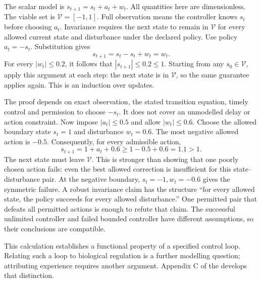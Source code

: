 The scalar model is $s_{t+1}=s_t+a_t+w_t$. All quantities here are dimensionless. The viable set is $\mathcal V=[-1,1]$. Full observation means the controller knows $s_t$ before choosing $a_t$. Invariance requires the next state to remain in $\mathcal V$ for every allowed current state and disturbance under the declared policy.
Use policy $a_t=-s_t$. Substitution gives
\[
s_{t+1}=s_t-s_t+w_t=w_t.
\]
For every $|w_t|\leq0.2$, it follows that $|s_{t+1}|\leq0.2\leq1$. Starting from any $s_0\in\mathcal V$, apply this argument at each step: the next state is in $\mathcal V$, so the same guarantee applies again. This is an induction over updates.

The proof depends on exact observation, the stated transition equation, timely control and permission to choose $-s_t$. It does not cover an unmodelled delay or action constraint.
Now impose $|a_t|\leq0.5$ and allow $|w_t|\leq0.6$. Choose the allowed boundary state $s_t=1$ and disturbance $w_t=0.6$. The most negative allowed action is $-0.5$. Consequently, for every admissible action,
\[
s_{t+1}=1+a_t+0.6\geq1-0.5+0.6=1.1>1.
\]
The next state must leave $\mathcal V$. This is stronger than showing that one poorly chosen action fails: even the best allowed correction is insufficient for this state--disturbance pair. At the negative boundary, $s_t=-1,w_t=-0.6$ gives the symmetric failure.
A robust invariance claim has the structure ``for every allowed state, the policy succeeds for every allowed disturbance.'' One permitted pair that defeats all permitted actions is enough to refute that claim. The successful unlimited controller and failed bounded controller have different assumptions, so their conclusions are compatible.

This calculation establishes a functional property of a specified control loop. Relating such a loop to biological regulation is a further modelling question; attributing experience requires another argument. Appendix C of the  develops that distinction.

